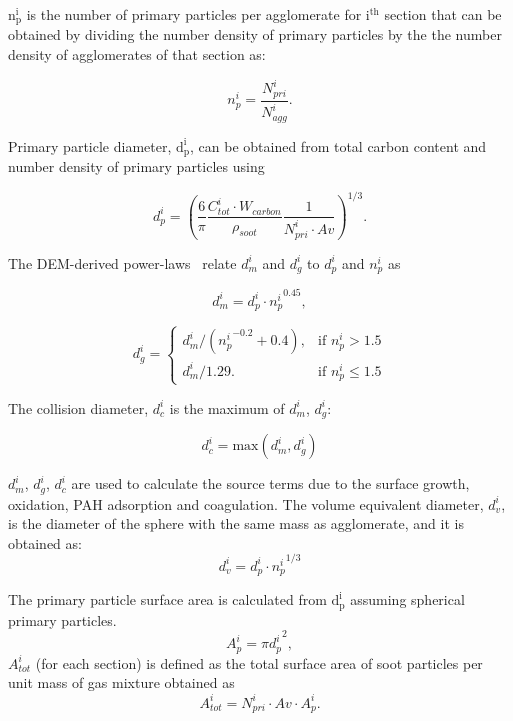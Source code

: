 $\mathrm{n^i_p}$ is the number of primary particles per agglomerate for $\mathrm{i^{th}}$ section that can be obtained by dividing the number density of primary particles by the the number density of agglomerates of that section as:

\begin{equation}
	n^i_p = \frac{N^i_{pri}}{N^i_{agg}}
	\label{eqn:n_p}.
\end{equation}

Primary particle diameter, $\mathrm{d^i_p}$, can be obtained from total carbon content and number density of primary particles using

\begin{equation}
	d^i_p = \left(\frac{6}{\pi} \frac{C^i_{tot}\cdot W_{carbon}}{\rho_{soot}} \frac{1}{N^i_{pri}\cdot Av} \right)^{1/3}
	\label{eqn:d_p}.
\end{equation}

The DEM-derived power-laws~\citep{Kelesidis2017} relate ${d^i_m}$ and ${d^i_g}$ to ${d^i_p}$ and ${n^i_p}$ as

\begin{equation}
	d^i_{m} = d^i_p\cdot {n^i_p}^{0.45}
	\label{eqn:d_m},
\end{equation}

\begin{equation}
	d^i_g = 
	\left\{
	\begin{array}{lr}
		d^i_m/({n^i_p}^{-0.2}+0.4), & \text{if } n^i_p > 1.5\\
		d^i_m/1.29. & \text{if } n^i_p\leq 1.5
	\end{array}
	\right.
	\label{eqn:d_g}
\end{equation}

The collision diameter, ${d^i_c}$ is the maximum of ${d^i_{m}}$, ${d^i_{g}}$:

\begin{equation}
	d^i_c = \mathrm{max}\left(d^i_m, d^i_g\right)
	\label{eqn:d_c}
\end{equation}

${d^i_{m}}$, ${d^i_{g}}$, ${d^i_{c}}$ are used to calculate the source terms due to the surface growth, oxidation, PAH adsorption and coagulation. The volume equivalent diameter, $d^i_v$, is the diameter of the sphere with the same mass as agglomerate, and it is obtained as:
\begin{equation}
	d^i_v = d^i_p \cdot {n^i_p}^{1/3}
	\label{eqn:d_v}
\end{equation}

The primary particle surface area is calculated from $\mathrm{d^i_p}$ assuming spherical primary particles.
\begin{equation}
	A^i_{p} = \pi {d^i_p}^2
	\label{eqn:Ap},
\end{equation}
$A^i_{tot}$ (for each section) is defined as the total surface area of soot particles per unit mass of gas mixture obtained as
\begin{equation}
	A^i_{tot} = N^i_{pri}\cdot Av\cdot A^i_{p}
	\label{eqn:Atot}.
\end{equation}

